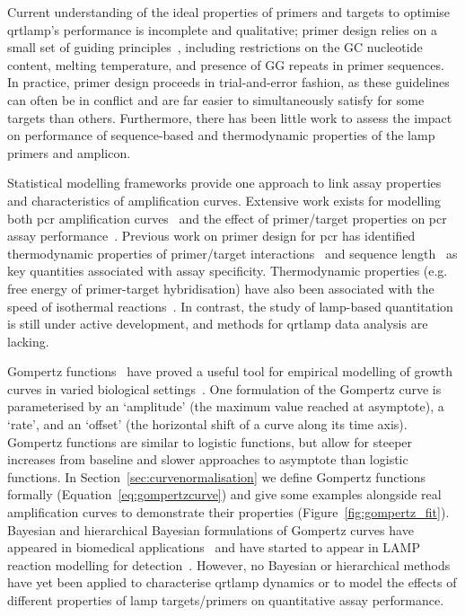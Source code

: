\documentclass[../thesis.tex]{subfiles}
\begin{document}
Current understanding of the ideal properties of primers and targets to optimise \gls{qrtlamp}'s performance is incomplete and qualitative; primer design relies on a small set of guiding principles~\citep{panno_loop_2020}, including restrictions on the GC nucleotide content, melting temperature, and presence of GG repeats in primer sequences. In practice, primer design proceeds in trial-and-error fashion, as these guidelines can often be in conflict and are far easier to simultaneously satisfy for some  targets than others. Furthermore, there has been little work to assess the impact on performance of sequence-based and thermodynamic properties of the \gls{lamp} primers and amplicon.

Statistical modelling frameworks provide one approach to link assay properties and characteristics of amplification curves. Extensive work exists for modelling both \gls{pcr} amplification curves~\citep{spiess_highly_2008, matz_no_2013, subramanian_empirical_2014,  nguyen_quantification_2020} and the effect of primer/target properties on \gls{pcr} assay performance~\citep{mallona_pcrefficiency_2011, wright_exploiting_2014, doring_modeling_2019}. Previous work on primer design for \gls{pcr} has identified thermodynamic properties of primer/target interactions~\citep{mann_thermodynamic_2009, li_primer_2010, doring_modeling_2019} and sequence length~\citep{huang_developing_2022} as key quantities associated with assay specificity. Thermodynamic properties (e.g. free energy of primer-target hybridisation) have also been associated with the speed of isothermal reactions~\citep{kimura_optimization_2011}.
In contrast, the study of \gls{lamp}-based quantitation is still under active development, and methods for \gls{qrtlamp} data analysis are lacking. 

Gompertz functions~\citep{gompertz_xxiv_1825} have proved a useful tool for empirical modelling of growth curves in varied biological settings~\citep{tjorve_use_2017}.  One formulation of the Gompertz curve is parameterised by an `amplitude' (the maximum value reached at asymptote), a `rate', and an `offset' (the horizontal shift of a curve along its time axis). Gompertz functions are similar to logistic functions, but allow for steeper increases from baseline and slower approaches to asymptote than logistic functions. In Section~\ref{sec:curvenormalisation} we define Gompertz functions formally (Equation~\ref{eq:gompertzcurve}) and give some examples alongside real amplification curves to demonstrate their properties (Figure~\ref{fig:gompertz_fit}). Bayesian and hierarchical Bayesian formulations of Gompertz curves have appeared in biomedical applications~\citep{wiper_bayesian_2010,  demirhan_bayesian_2015, sasaki_informative_2016,gotuzzo_bayesian_2019, vaghi_population_2020, berihuete_bayesian_2021} and have started to appear in LAMP reaction modelling for detection~\citep{carvalho_faster_2021}. However, no Bayesian or hierarchical methods have yet been applied to characterise \gls{qrtlamp} dynamics or to model the effects of different properties of \gls{lamp} targets/primers on quantitative assay performance.
\end{document}
